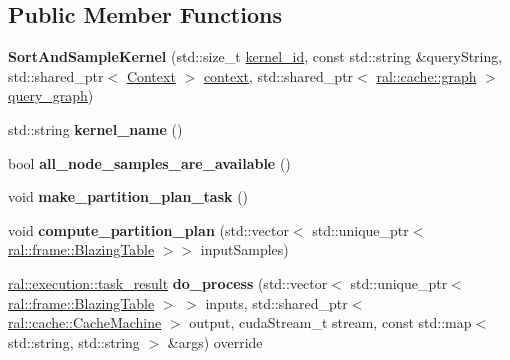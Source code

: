\subsection*{Public Member Functions}
\begin{DoxyCompactItemize}
\item 
\mbox{\label{classral_1_1batch_1_1SortAndSampleKernel_af15b22b691522f30c535dc27de833c7a}} 
{\bfseries Sort\+And\+Sample\+Kernel} (std\+::size\+\_\+t \hyperlink{classral_1_1cache_1_1kernel_a2fd708656cb056a41ec635b8bdc4acfe}{kernel\+\_\+id}, const std\+::string \&query\+String, std\+::shared\+\_\+ptr$<$ \hyperlink{classblazingdb_1_1manager_1_1Context}{Context} $>$ \hyperlink{classral_1_1cache_1_1kernel_af0347d14d678cfa7205c1387746a2e1b}{context}, std\+::shared\+\_\+ptr$<$ \hyperlink{classral_1_1cache_1_1graph}{ral\+::cache\+::graph} $>$ \hyperlink{classral_1_1cache_1_1kernel_a5fbb02292aff165a28ef25e75f0d89bd}{query\+\_\+graph})
\item 
\mbox{\label{classral_1_1batch_1_1SortAndSampleKernel_a7f8b8572094bb3736c710d94aaff7c22}} 
std\+::string {\bfseries kernel\+\_\+name} ()
\item 
\mbox{\label{classral_1_1batch_1_1SortAndSampleKernel_a004d7cb151af63cf047378665b631ac5}} 
bool {\bfseries all\+\_\+node\+\_\+samples\+\_\+are\+\_\+available} ()
\item 
\mbox{\label{classral_1_1batch_1_1SortAndSampleKernel_a92e46b25071c551934684c17f373c568}} 
void {\bfseries make\+\_\+partition\+\_\+plan\+\_\+task} ()
\item 
\mbox{\label{classral_1_1batch_1_1SortAndSampleKernel_ab124ee9bca0bb507179224a7633c750f}} 
void {\bfseries compute\+\_\+partition\+\_\+plan} (std\+::vector$<$ std\+::unique\+\_\+ptr$<$ \hyperlink{classral_1_1frame_1_1BlazingTable}{ral\+::frame\+::\+Blazing\+Table} $>$$>$ input\+Samples)
\item 
\mbox{\label{classral_1_1batch_1_1SortAndSampleKernel_affbf08b8a02848965e7b660e37bd0b4f}} 
\hyperlink{structral_1_1execution_1_1task__result}{ral\+::execution\+::task\+\_\+result} {\bfseries do\+\_\+process} (std\+::vector$<$ std\+::unique\+\_\+ptr$<$ \hyperlink{classral_1_1frame_1_1BlazingTable}{ral\+::frame\+::\+Blazing\+Table} $>$ $>$ inputs, std\+::shared\+\_\+ptr$<$ \hyperlink{classral_1_1cache_1_1CacheMachine}{ral\+::cache\+::\+Cache\+Machine} $>$ output, cuda\+Stream\+\_\+t stream, const std\+::map$<$ std\+::string, std\+::string $>$ \&args) override
$$
\end{DoxyCompactItemize}
